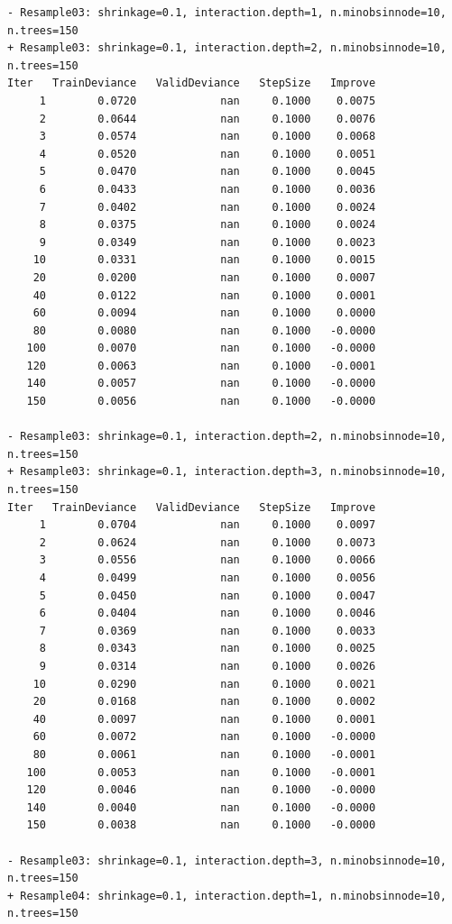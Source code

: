 \documentclass[
  letterpaper,
  DIV=11,
  numbers=noendperiod]{scrartcl}
\begin{document}
\begin{verbatim}
- Resample03: shrinkage=0.1, interaction.depth=1, n.minobsinnode=10, n.trees=150 
+ Resample03: shrinkage=0.1, interaction.depth=2, n.minobsinnode=10, n.trees=150 
Iter   TrainDeviance   ValidDeviance   StepSize   Improve
     1        0.0720             nan     0.1000    0.0075
     2        0.0644             nan     0.1000    0.0076
     3        0.0574             nan     0.1000    0.0068
     4        0.0520             nan     0.1000    0.0051
     5        0.0470             nan     0.1000    0.0045
     6        0.0433             nan     0.1000    0.0036
     7        0.0402             nan     0.1000    0.0024
     8        0.0375             nan     0.1000    0.0024
     9        0.0349             nan     0.1000    0.0023
    10        0.0331             nan     0.1000    0.0015
    20        0.0200             nan     0.1000    0.0007
    40        0.0122             nan     0.1000    0.0001
    60        0.0094             nan     0.1000    0.0000
    80        0.0080             nan     0.1000   -0.0000
   100        0.0070             nan     0.1000   -0.0000
   120        0.0063             nan     0.1000   -0.0001
   140        0.0057             nan     0.1000   -0.0000
   150        0.0056             nan     0.1000   -0.0000

- Resample03: shrinkage=0.1, interaction.depth=2, n.minobsinnode=10, n.trees=150 
+ Resample03: shrinkage=0.1, interaction.depth=3, n.minobsinnode=10, n.trees=150 
Iter   TrainDeviance   ValidDeviance   StepSize   Improve
     1        0.0704             nan     0.1000    0.0097
     2        0.0624             nan     0.1000    0.0073
     3        0.0556             nan     0.1000    0.0066
     4        0.0499             nan     0.1000    0.0056
     5        0.0450             nan     0.1000    0.0047
     6        0.0404             nan     0.1000    0.0046
     7        0.0369             nan     0.1000    0.0033
     8        0.0343             nan     0.1000    0.0025
     9        0.0314             nan     0.1000    0.0026
    10        0.0290             nan     0.1000    0.0021
    20        0.0168             nan     0.1000    0.0002
    40        0.0097             nan     0.1000    0.0001
    60        0.0072             nan     0.1000   -0.0000
    80        0.0061             nan     0.1000   -0.0001
   100        0.0053             nan     0.1000   -0.0001
   120        0.0046             nan     0.1000   -0.0000
   140        0.0040             nan     0.1000   -0.0000
   150        0.0038             nan     0.1000   -0.0000

- Resample03: shrinkage=0.1, interaction.depth=3, n.minobsinnode=10, n.trees=150 
+ Resample04: shrinkage=0.1, interaction.depth=1, n.minobsinnode=10, n.trees=150 
\end{verbatim}
\end{document}
